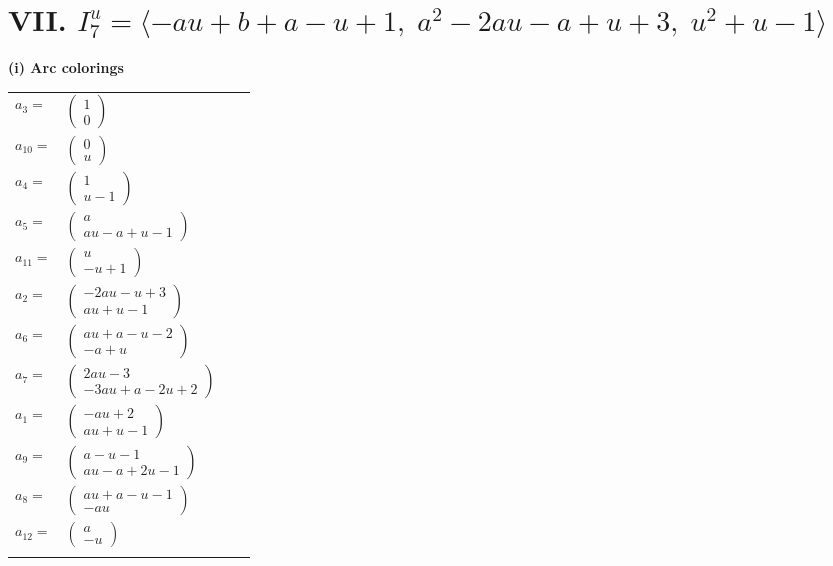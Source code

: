 \documentclass[1p]{elsarticle_modified}
\theoremstyle{definition}
\begin{document}
\centering \section*{VII. $I^u_{7}= \langle - a u+b+a- u+1,\;a^2-2 a u- a+u+3,\;u^2+u-1 \rangle$}
\flushleft \textbf{(i) Arc colorings}\\
\begin{tabular}{m{7pt} m{180pt} m{7pt} m{180pt} }
\flushright $a_{3}=$&$\begin{pmatrix}1\\0\end{pmatrix}$ \\
\flushright $a_{10}=$&$\begin{pmatrix}0\\u\end{pmatrix}$ \\
\flushright $a_{4}=$&$\begin{pmatrix}1\\u-1\end{pmatrix}$ \\
\flushright $a_{5}=$&$\begin{pmatrix}a\\a u- a+u-1\end{pmatrix}$ \\
\flushright $a_{11}=$&$\begin{pmatrix}u\\- u+1\end{pmatrix}$ \\
\flushright $a_{2}=$&$\begin{pmatrix}-2 a u- u+3\\a u+u-1\end{pmatrix}$ \\
\flushright $a_{6}=$&$\begin{pmatrix}a u+a- u-2\\- a+u\end{pmatrix}$ \\
\flushright $a_{7}=$&$\begin{pmatrix}2 a u-3\\-3 a u+a-2 u+2\end{pmatrix}$ \\
\flushright $a_{1}=$&$\begin{pmatrix}- a u+2\\a u+u-1\end{pmatrix}$ \\
\flushright $a_{9}=$&$\begin{pmatrix}a- u-1\\a u- a+2 u-1\end{pmatrix}$ \\
\flushright $a_{8}=$&$\begin{pmatrix}a u+a- u-1\\- a u\end{pmatrix}$ \\
\flushright $a_{12}=$&$\begin{pmatrix}a\\- u\end{pmatrix}$\\&\end{tabular}
\end{document}
